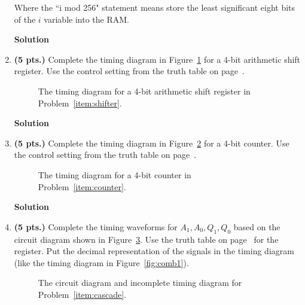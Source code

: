\begin{enumerate}
Where the ``i mod 256" statement means store the least significant 
eight bits of the $i$ variable into the RAM. 

\begin{onlysolution}  \textbf{Solution} \itshape{
\begin{figure}[ht]
\end{figure}
}\end{onlysolution} 

\item\textbf{ (5 pts.)} Complete the timing diagram in Figure~\ref{fig:hwshift}
\label{item:shifter}
for a 4-bit arithmetic shift register.  Use the control setting from the
truth table on page~\pageref{page:shi}.
\begin{figure}[ht]
\caption{The timing diagram for a 4-bit arithmetic shift register in 
Problem~\ref{item:shifter}.}
\label{fig:hwshift}
\end{figure}

\begin{onlysolution}  \textbf{Solution} \itshape{
\begin{figure}[ht]
\end{figure}
} \end{onlysolution} 


\item\textbf{ (5 pts.)} Complete the timing diagram in Figure~\ref{fig:hwcount}
\label{item:counter}
for a 4-bit counter.  Use the control setting from the truth table on 
page~\pageref{page:counter}.
\begin{figure}[ht]
\caption{The timing diagram for a 4-bit counter in 
Problem~\ref{item:counter}.}
\label{fig:hwcount}
\end{figure}

\begin{onlysolution}  \textbf{Solution} \itshape{
\begin{figure}[ht]
\end{figure}
} \end{onlysolution} 


\item\textbf{ (5 pts.)} Complete the timing waveforms for $A_1, A_0, Q_1, Q_0$
\label{item:cascade}
based on the circuit diagram shown in Figure~\ref{fig:cascade}.  Use the truth 
table on page~\pageref{page:reg} for the register. Put the decimal 
representation of the signals in the timing diagram (like the timing 
diagram in Figure~\ref{fig:comb1}).
\begin{figure}[ht]
\caption{The circuit diagram and incomplete timing diagram for 
Problem~\ref{item:cascade}.}
\label{fig:cascade}
\end{figure}


\end{enumerate}
